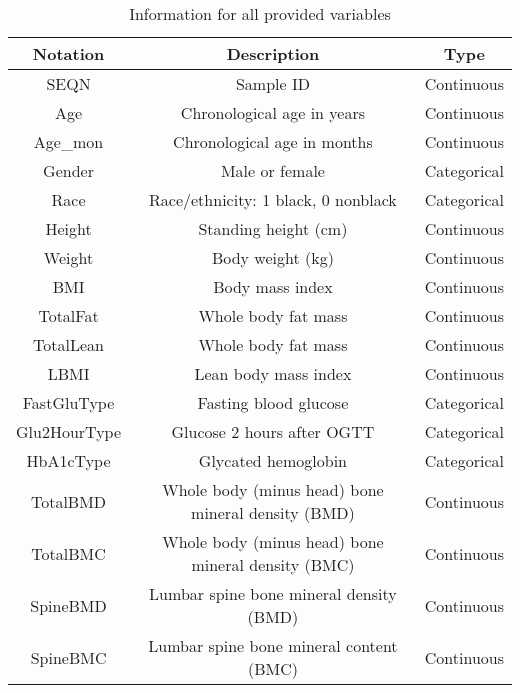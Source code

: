 \documentclass[11pt]{article}
\begin{document}
           \begin{table}[ht]
			\centering 
				\caption{ Information for all provided variables\label{data3}}
				\begin{tabular}{|c|c|c|}
					\hline
                	Notation & Description	& Type\\
                	\hline
                    SEQN &Sample ID &	Continuous\\\hline
                    Age&Chronological age in years&	Continuous\\\hline
                    Age\_mon & Chronological age in months&	Continuous\\\hline
                    Gender&	Male or female&	Categorical\\\hline
                    Race& Race/ethnicity: 1 black, 0 nonblack & Categorical\\\hline
                    Height&	Standing height (cm)&	Continuous\\
					\hline
					Weight&	Body weight (kg)&	Continuous\\
					\hline
					BMI&	Body mass index &	Continuous\\
					\hline
					TotalFat &	Whole body fat mass&	Continuous\\
					\hline
					TotalLean &	Whole body fat mass&	Continuous\\
					\hline
					LBMI &	Lean body mass index&	Continuous\\
					\hline
					FastGluType  &	Fasting blood glucose&	Categorical\\
					\hline
					Glu2HourType &	Glucose 2 hours after OGTT &	Categorical\\
					\hline
					HbA1cType &	Glycated hemoglobin&	Categorical\\
					\hline
					TotalBMD&	Whole body (minus head) bone mineral density (BMD)&	Continuous\\
					\hline
					TotalBMC &	Whole body (minus head) bone mineral density (BMC)&	Continuous\\
					\hline
					SpineBMD &	Lumbar spine bone mineral density (BMD)&	Continuous\\
					\hline
					SpineBMC &	Lumbar spine bone mineral content (BMC)&	Continuous\\
					\hline
				\end{tabular}
			\end{table}
			
\end{document}
